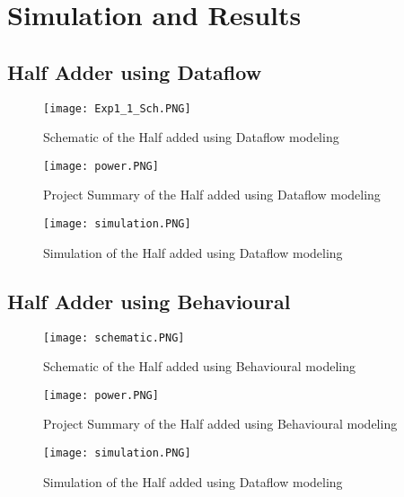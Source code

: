 \section{Simulation and Results}
\subsection{Half Adder using Dataflow}
\begin{figure}[h!]
\centering
\texttt{[image: Exp1\_1\_Sch.PNG]}
\caption{Schematic of the Half added using Dataflow modeling}
\label{figure:1}
\end{figure}



\begin{figure}[h!]
\centering
\texttt{[image: power.PNG]}
\caption{Project Summary of the Half added using Dataflow modeling}
\label{figure:2}


\end{figure}


\begin{figure}[h!]
\centering
\texttt{[image: simulation.PNG]}
\caption{Simulation of the Half added using Dataflow modeling}
\label{figure:3}
\end{figure}

\FloatBarrier   \clearpage

\subsection{Half Adder using Behavioural }
\begin{figure}[h!]
\centering
\texttt{[image: schematic.PNG]}
\caption{Schematic of the Half added using Behavioural modeling}
\label{figure:1}
\end{figure}


\begin{figure}[h!]
\centering
\texttt{[image: power.PNG]}
\caption{Project Summary of the Half added using Behavioural modeling}
\label{figure:2}


\end{figure}


\begin{figure}[h!]
\centering
\texttt{[image: simulation.PNG]}
\caption{Simulation of the Half added using Dataflow modeling}
\label{figure:3}
\end{figure}

\FloatBarrier 

